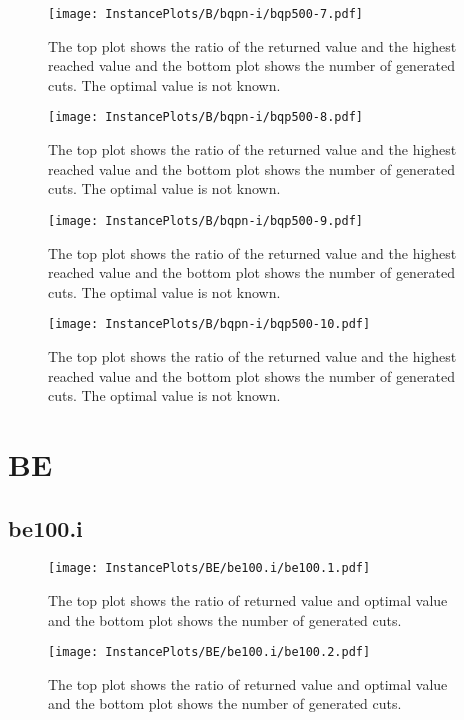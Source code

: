 \documentclass[10pt,a4paper]{article}
\begin{document}
\begin{figure}[H]
\texttt{[image: InstancePlots/B/bqpn-i/bqp500-7.pdf]}
\caption{The top plot shows the ratio of the returned value and the highest reached value     and the bottom plot shows the number of generated cuts. The optimal value is not known.}
\end{figure}

\begin{figure}[H]
\texttt{[image: InstancePlots/B/bqpn-i/bqp500-8.pdf]}
\caption{The top plot shows the ratio of the returned value and the highest reached value     and the bottom plot shows the number of generated cuts. The optimal value is not known.}
\end{figure}

\begin{figure}[H]
\texttt{[image: InstancePlots/B/bqpn-i/bqp500-9.pdf]}
\caption{The top plot shows the ratio of the returned value and the highest reached value     and the bottom plot shows the number of generated cuts. The optimal value is not known.}
\end{figure}

\begin{figure}[H]
\texttt{[image: InstancePlots/B/bqpn-i/bqp500-10.pdf]}
\caption{The top plot shows the ratio of the returned value and the highest reached value     and the bottom plot shows the number of generated cuts. The optimal value is not known.}
\end{figure}

\section{BE}
\subsection{be100.i}
\begin{figure}[H]
\texttt{[image: InstancePlots/BE/be100.i/be100.1.pdf]}
\caption{The top plot shows the ratio of returned value and optimal value     and the bottom plot shows the number of generated cuts.}
\end{figure}

\begin{figure}[H]
\texttt{[image: InstancePlots/BE/be100.i/be100.2.pdf]}
\caption{The top plot shows the ratio of returned value and optimal value     and the bottom plot shows the number of generated cuts.}
\end{figure}
\end{document}
